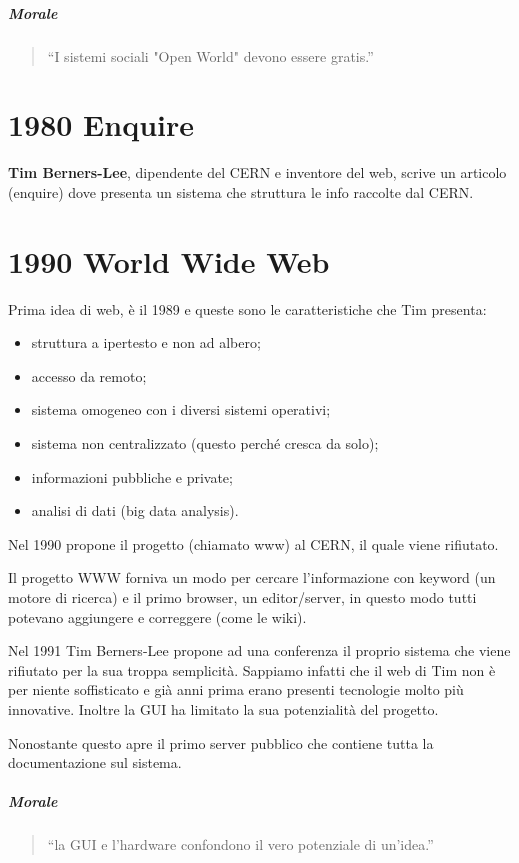 		
		
		
	\subparagraph*{Morale}
			\begin{quote}
				``I sistemi sociali "Open World" devono essere gratis.''
			\end{quote}
		
	\section{1980 Enquire}
		\textbf{Tim Berners-Lee}, dipendente del CERN e inventore del web, scrive un articolo (enquire) dove presenta un sistema che struttura le info raccolte dal CERN.
		
		
	\section{1990 World Wide Web}
		Prima idea di web, è il 1989 e queste sono le caratteristiche che Tim presenta:
		\begin{itemize}
			\item struttura a ipertesto e non ad albero;
			\item accesso da remoto;
			\item sistema omogeneo con i diversi sistemi operativi;
			\item sistema non centralizzato (questo perché cresca da solo);
			\item informazioni pubbliche e private;
			\item analisi di dati (big data analysis).
		\end{itemize}
	
		Nel 1990 propone il progetto (chiamato www) al CERN, il quale viene rifiutato.
		
		Il progetto WWW forniva un modo per cercare l'informazione con keyword (un motore di ricerca) e il primo browser, un editor/server, in questo modo tutti potevano aggiungere e correggere (come le wiki).
		
		Nel 1991 Tim Berners-Lee propone ad una conferenza il proprio sistema che viene rifiutato per la sua troppa semplicità. Sappiamo infatti che il web di Tim non è per niente soffisticato e già anni prima erano presenti tecnologie molto più innovative. Inoltre la GUI ha limitato la sua potenzialità del progetto.
		
		Nonostante questo apre il primo server pubblico che contiene tutta la documentazione sul sistema.
		
		\subparagraph*{Morale}
		\begin{quote}
			``la GUI e l’hardware confondono il vero potenziale di un'idea.''
		\end{quote}
		
